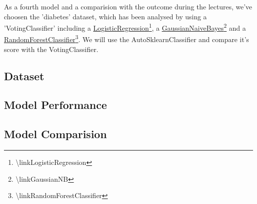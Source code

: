 As a fourth model and a comparision with the outcome during the lectures, we've choosen the 'diabetes' dataset, which has been analysed by using a 'VotingClassifier' including a \href{\linkLogisticRegression}{LogisticRegression\footnote{\url{\linkLogisticRegression}}}, a \href{\linkGaussianNB}{GaussianNaiveBayes\footnote{\url{\linkGaussianNB}}} and a \href{\linkRandomForestClassifier}{RandomForestClassifier\footnote{\url{\linkRandomForestClassifier}}}. We will use the AutoSklearnClassifier and compare it's score with the VotingClassifier.

\subsection{Dataset}


\subsection{Model Performance}
\subsection{Model Comparision}
